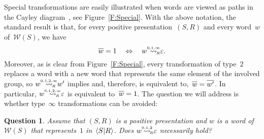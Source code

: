 \documentclass{amsart}
\numberwithin{equation}{section}
\theoremstyle{plain}
\newtheorem{ques}[prop]{Question}
\theoremstyle{definition}
\begin{document}
Special transformations are easily illustrated when words are viewed as paths in the Cayley diagram~\cite{Eps}, see Figure~\ref{F:Special}. With the above notation, the standard  result is that, for every positive presentation~$({S}, {R})$ and every word~${w}$ of~${\mathcal{W}({S})}$, we have
\begin{equation}
\label{E:Equiv}
{\overline{\vrule width0pt height5pt{w}}} = 1 \quad \Leftrightarrow \quad {w} {\mathrel{{\mathrel{\overset{\scriptscriptstyle 0,1,\infty}{\rightsquigarrow}}}_{\hspace{-1.2ex}{\scriptscriptstyle R}}}} {\varepsilon}.
\end{equation}
Moreover, as is clear from Figure~\ref{F:Special}, every transformation of type~$2$ replaces a word with a new word that represents the same element of the involved group, so ${w} {\mathrel{{\mathrel{\overset{\scriptscriptstyle 0,1,2,\infty}{\rightsquigarrow}}}_{\hspace{-1.8ex}{\scriptscriptstyle R}\hspace{0.5ex}}}} {w}'$ implies and, therefore, is equivalent to,~${\overline{\vrule width0pt height5pt{w}}}  = {\overline{\vrule width0pt height5pt{{w}'}}}$. In particular, ${w} {\mathrel{{\mathrel{\overset{\scriptscriptstyle 0,1,2,\infty}{\rightsquigarrow}}}_{\hspace{-1.8ex}{\scriptscriptstyle R}\hspace{0.5ex}}}} {\varepsilon}$ is equivalent to~${\overline{\vrule width0pt height5pt{w}}} = 1$. The question we will address is whether type~$\infty$ transformations can be avoided:

\begin{ques}
\label{Q:Final}
Assume that $({S}, {R})$ is a positive presentation and ${w}$ is a word of~${\mathcal{W}({S})}$ that represents~$1$ in~${\langle{S}{\mid}\nobreak{R}\rangle}$. Does ${w} {\mathrel{{\mathrel{\overset{\scriptscriptstyle 0,1,2}{\rightsquigarrow}}}_{\hspace{-0.9ex}{\scriptscriptstyle R}}}} {\varepsilon}$ necessarily hold?
\end{ques}
\end{document}
